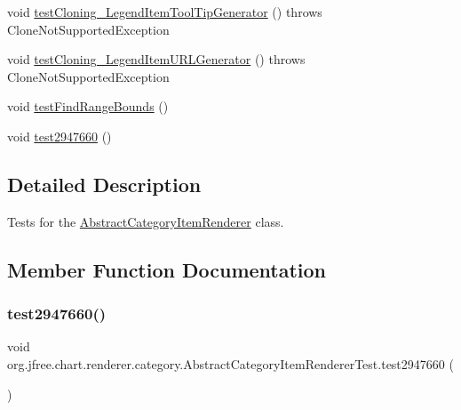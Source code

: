 \begin{DoxyCompactItemize}
\item 
void \mbox{\hyperlink{classorg_1_1jfree_1_1chart_1_1renderer_1_1category_1_1_abstract_category_item_renderer_test_a95bb5ea8badf7defa3887e8700489c98}{test\+Cloning\+\_\+\+Legend\+Item\+Tool\+Tip\+Generator}} ()  throws Clone\+Not\+Supported\+Exception 
\item 
void \mbox{\hyperlink{classorg_1_1jfree_1_1chart_1_1renderer_1_1category_1_1_abstract_category_item_renderer_test_a74332796b08f2a89f9b8331ea584c487}{test\+Cloning\+\_\+\+Legend\+Item\+U\+R\+L\+Generator}} ()  throws Clone\+Not\+Supported\+Exception 
\item 
void \mbox{\hyperlink{classorg_1_1jfree_1_1chart_1_1renderer_1_1category_1_1_abstract_category_item_renderer_test_a7ad071865a133b8963d5026df98f556c}{test\+Find\+Range\+Bounds}} ()
\item 
void \mbox{\hyperlink{classorg_1_1jfree_1_1chart_1_1renderer_1_1category_1_1_abstract_category_item_renderer_test_aefaea7cebf2360cf2e75520b91127256}{test2947660}} ()
\end{DoxyCompactItemize}


\subsection{Detailed Description}
Tests for the \mbox{\hyperlink{classorg_1_1jfree_1_1chart_1_1renderer_1_1category_1_1_abstract_category_item_renderer}{Abstract\+Category\+Item\+Renderer}} class. 

\subsection{Member Function Documentation}
\mbox{\label{classorg_1_1jfree_1_1chart_1_1renderer_1_1category_1_1_abstract_category_item_renderer_test_aefaea7cebf2360cf2e75520b91127256}} 
\subsubsection{\texorpdfstring{test2947660()}{test2947660()}}
{\footnotesize\ttfamily void org.\+jfree.\+chart.\+renderer.\+category.\+Abstract\+Category\+Item\+Renderer\+Test.\+test2947660 (\begin{DoxyParamCaption}{ }\end{DoxyParamCaption})}

